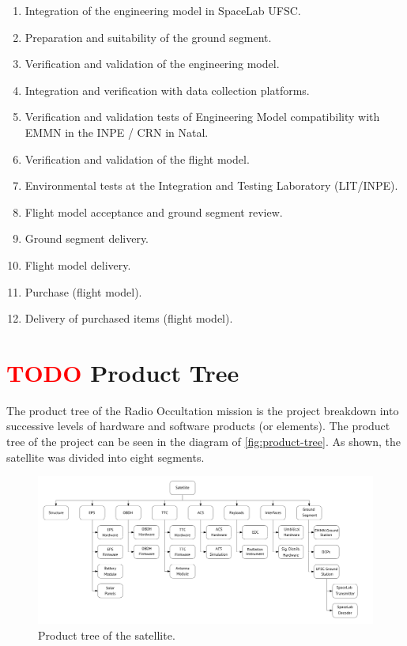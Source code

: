 \begin{enumerate}
    \item Integration of the engineering model in SpaceLab UFSC.
    \item Preparation and suitability of the ground segment.
    \item Verification and validation of the engineering model.
    \item Integration and verification with data collection platforms.
    \item Verification and validation tests of Engineering Model compatibility with EMMN in the INPE / CRN in Natal.
    \item Verification and validation of the flight model.
    \item Environmental tests at the Integration and Testing Laboratory (LIT/INPE).
    \item Flight model acceptance and ground segment review.
    \item Ground segment delivery.
    \item Flight model delivery.
    \item Purchase (flight model).
    \item Delivery of purchased items (flight model).
\end{enumerate}

\section{ \textcolor{red}{TODO} Product Tree}

The product tree of the Radio Occultation mission is the project breakdown into successive levels of hardware and software products (or elements). The product tree of the project can be seen in the diagram of \autoref{fig:product-tree}. As shown, the satellite was divided into eight segments.

\begin{figure}[!ht]
    \begin{center}
        \includegraphics[width=\textwidth]{figures/product-tree.pdf}
        \caption{Product tree of the satellite.}
        \label{fig:product-tree}
    \end{center}
\end{figure}

